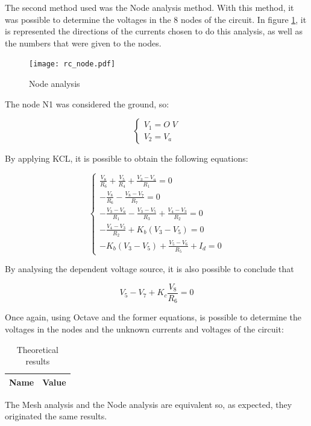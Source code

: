 The second method used was the Node analysis method. With this method, it was possible to determine the voltages in the 8 nodes of the circuit. In figure \ref{node_fig}, it is represented the directions of the currents chosen to do this analysis, as well as the numbers that were given to the nodes.

\begin{figure}[H]
  \centering
  \texttt{[image: rc\_node.pdf]}
  \caption{Node analysis}
  \label{node_fig}
\end{figure}

The node N1 was considered the ground, so:

\begin{equation}
  \begin{cases}
    V_1 = O \; V \\
    V_2 = V_a
  \end{cases}
\end{equation}

By applying KCL, it is possible to obtain the following equations:

\begin{equation}
  \begin{cases}
    \frac{V_8}{R_6} + \frac{V_5}{R_4} + \frac{V_3-V_a}{R_1} = 0 \\
    -\frac{V_8}{R_6} - \frac{V_8-V_7}{R_7} = 0 \\
    -\frac{V_3-V_a}{R_1} - \frac{V_3-V_5}{R_3} + \frac{V_4-V_3}{R_2} = 0 \\
    -\frac{V_4-V_3}{R_2} + K_b(V_3-V_5) = 0 \\
    -K_b(V_3-V_5) + \frac{V_5-V_6}{R_5} + I_d = 0
  \end{cases}
\end{equation}

By analysing the dependent voltage source, it is also possible to conclude that

\begin{equation}
  V_5 - V_7 + K_c\frac{V_8}{R_6} = 0
\end{equation}

Once again, using Octave and the former equations, is possible to determine the voltages in the nodes and the unknown currents and voltages of the circuit:

\begin{table}[H]
  \centering
  \begin{tabular}{|c|r|}
    \hline
        {\bf Name} & {\bf Value} \\
        \hline
        \hline
        
        \hline
  \end{tabular}
  \caption{Theoretical results}
  \label{node_res}
\end{table} 

The Mesh analysis and the Node analysis are equivalent so, as expected, they originated the same results.  


